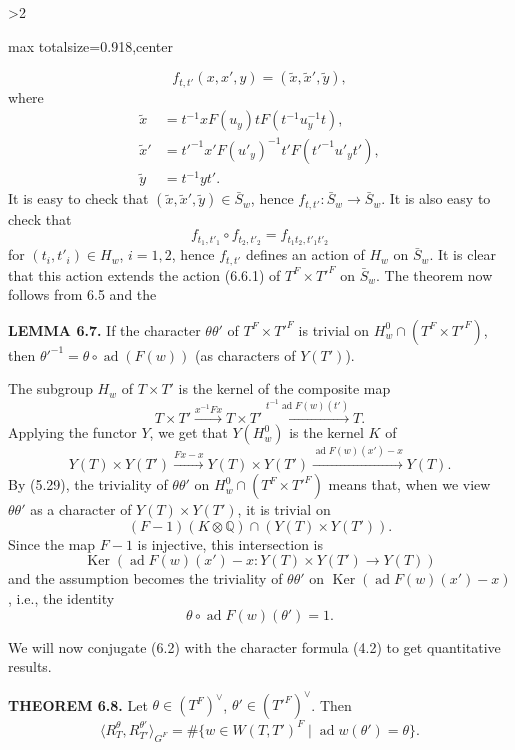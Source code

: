\documentclass[9pt,twoside]{extarticle}
\newcommand{\EditionPage}[3]{%
  \ifnum#1>2\clearpage\fi
  \pdfbookmark[1]{Printed page #2}{en-folio-#2}%
  \hypertarget{en-physical-#1}{}%
  \noindent\begin{adjustbox}{max totalsize={\textwidth}{0.918\textheight},center}
  \begin{minipage}[t]{\textwidth}
  \fontsize{9.4}{11.1}\selectfont\justifying
  #3
  \end{minipage}
  \end{adjustbox}%
}
\begin{document}
\EditionPage{37}{138}{%
\[
f_{t,t'}(x,x',y)=(\widetilde x,\widetilde x',\widetilde y),
\] where \[
\begin{aligned}
\widetilde x&=t^{-1}xF(u_y)tF(t^{-1}u_y^{-1}t),\\
\widetilde x'&=t'^{-1}x'F(u'_y)^{-1}t'F(t'^{-1}u'_yt'),\\
\widetilde y&=t^{-1}yt'.
\end{aligned}
\] It is easy to check that \((\widetilde x,\widetilde x',\widetilde y)\in\bar S_w\), hence \(f_{t,t'}:\bar S_w\longrightarrow\bar S_w\). It is also easy to check that \[
f_{t_1,t'_1}\circ f_{t_2,t'_2}=f_{t_1t_2,t'_1t'_2}
\] for \((t_i,t'_i)\in H_w\), \(i=1,2\), hence \(f_{t,t'}\) defines an action of \(H_w\) on \(\bar S_w\). It is clear that this action extends the action (6.6.1) of \(T^F\times T'^F\) on \(\bar S_w\). The theorem now follows from 6.5 and the\par

\noindent\textbf{LEMMA 6.7.} If the character \(\theta\theta'\) of \(T^F\times T'^F\) is trivial on \(H_w^0\cap(T^F\times T'^F)\), then \(\theta'^{-1}=\theta\circ\operatorname{ad}(F(w))\) (as characters of \(Y(T')\)).\par

The subgroup \(H_w\) of \(T\times T'\) is the kernel of the composite map \[
T\times T'\xrightarrow{x^{-1}Fx}T\times T'\xrightarrow{t^{-1}\operatorname{ad}F(w)(t')}T.
\] Applying the functor \(Y\), we get that \(Y(H_w^0)\) is the kernel \(K\) of \[
Y(T)\times Y(T')\xrightarrow{Fx-x}Y(T)\times Y(T')\xrightarrow{\operatorname{ad}F(w)(x')-x}Y(T).
\] By (5.29), the triviality of \(\theta\theta'\) on \(H_w^0\cap(T^F\times T'^F)\) means that, when we view \(\theta\theta'\) as a character of \(Y(T)\times Y(T')\), it is trivial on \[
(F-1)(K\otimes\mathbb Q)\cap(Y(T)\times Y(T')).
\] Since the map \(F-1\) is injective, this intersection is \[
\operatorname{Ker}(\operatorname{ad}F(w)(x')-x:Y(T)\times Y(T')\longrightarrow Y(T))
\] and the assumption becomes the triviality of \(\theta\theta'\) on \(\operatorname{Ker}(\operatorname{ad}F(w)(x')-x)\), i.e., the identity \[
\theta\circ\operatorname{ad}F(w)(\theta')=1.
\]\par

We will now conjugate (6.2) with the character formula (4.2) to get quantitative results.\par

\noindent\textbf{THEOREM 6.8.} Let \(\theta\in(T^F)^\vee\), \(\theta'\in(T'^F)^\vee\). Then \[
\langle R_T^\theta,R_{T'}^{\theta'}\rangle_{G^F}
=
\#\{w\in W(T,T')^F\mid \operatorname{ad}w(\theta')=\theta\}.
\]\par

}
\end{document}
